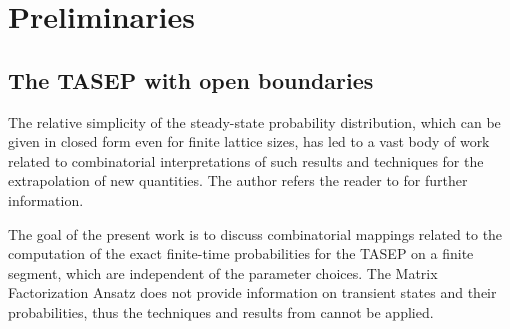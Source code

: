 \documentclass{article}
\begin{document}
\section{Preliminaries}


\subsection{The TASEP with open boundaries}


The relative simplicity of the steady-state probability distribution, which can be given in closed form even for finite lattice sizes, has led to a vast body of work related to combinatorial interpretations of such results and techniques for the extrapolation of new quantities. The author refers the reader to \cite{Wood_2020} for further information. 

The goal of the present work is to discuss combinatorial mappings related to the computation of the exact finite-time probabilities for the TASEP on a finite segment, which are independent of the parameter choices. The Matrix Factorization Ansatz does not provide information on transient states and their probabilities, thus the techniques and results from \cite{Wood_2020} cannot be applied. 
\end{document}

